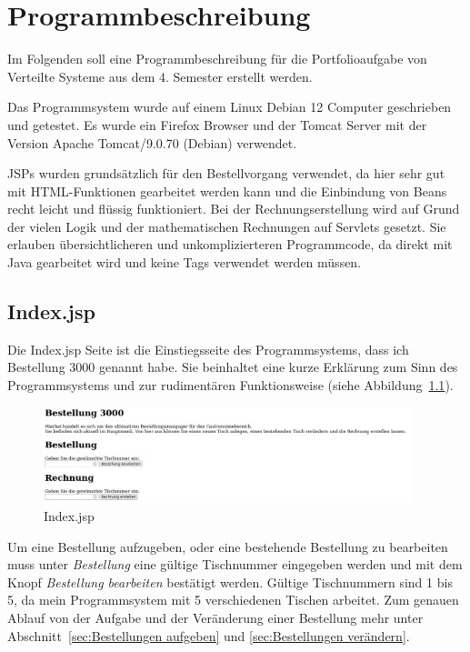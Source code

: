 \chapter{Programmbeschreibung} %
\label{chap:Programmbeschreibung}

Im Folgenden soll eine Programmbeschreibung für die Portfolioaufgabe von Verteilte Systeme aus dem 4. Semester erstellt werden.

Das Programmsystem wurde auf einem Linux Debian 12 Computer geschrieben und getestet.
Es wurde ein Firefox Browser und der Tomcat Server mit der Version Apache Tomcat/9.0.70 (Debian) verwendet.

JSPs wurden grundsätzlich für den Bestellvorgang verwendet, da hier sehr gut mit HTML-Funktionen gearbeitet werden kann und die Einbindung von Beans recht leicht und flüssig funktioniert.
Bei der Rechnungserstellung wird auf Grund der vielen Logik und der mathematischen Rechnungen auf Servlets gesetzt.
Sie erlauben übersichtlicheren und unkomplizierteren Programmcode, da direkt mit Java gearbeitet wird und keine Tags verwendet werden müssen.

\section{Index.jsp} %
\label{sec:Index.jsp}

Die Index.jsp Seite ist die Einstiegsseite des Programmsystems, dass ich Bestellung 3000 genannt habe.
Sie beinhaltet eine kurze Erklärung zum Sinn des Programmsystems und zur rudimentären Funktionsweise (siehe Abbildung~\ref{abb:IndexJSP}).

\begin{figure}[htb]
  \centering
  \includegraphics[width=0.95\textwidth]{images/IndexJSP.png}
  \caption[Index.jsp]{Index.jsp}
  \label{abb:IndexJSP}
\end{figure}

Um eine Bestellung aufzugeben, oder eine bestehende Bestellung zu bearbeiten muss unter \textit{Bestellung} eine gültige Tischnummer eingegeben werden und mit dem Knopf \textit{Bestellung bearbeiten} bestätigt werden.
Gültige Tischnummern sind 1 bis 5, da mein Programmsystem mit 5 verschiedenen Tischen arbeitet.
Zum genauen Ablauf von der Aufgabe und der Veränderung einer Bestellung mehr unter Abschnitt~\ref{sec:Bestellungen aufgeben} und \ref{sec:Bestellungen verändern}.

